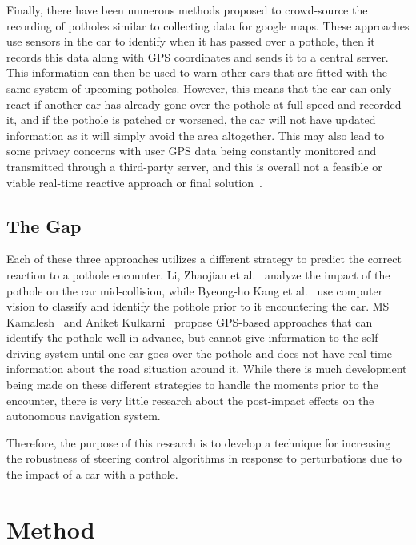 \documentclass{article}
\begin{document}
Finally, there have been numerous methods proposed to crowd-source the recording of potholes similar to collecting data for google maps. These approaches use sensors in the car to identify when it has passed over a pothole, then it records this data along with GPS coordinates and sends it to a central server. This information can then be used to warn other cars that are fitted with the same system of upcoming potholes. However, this means that the car can only react if another car has already gone over the pothole at full speed and recorded it, and if the pothole is patched or worsened, the car will not have updated information as it will simply avoid the area altogether. This may also lead to some privacy concerns with user GPS data being constantly monitored and transmitted through a third-party server, and this is overall not a feasible or viable real-time reactive approach or final solution~\cite{kamalesh2021intelligent,kulkarni2014pothole}.

\subsection{The Gap}

Each of these three approaches utilizes a different strategy to predict the correct reaction to a pothole encounter. Li, Zhaojian et al.~\cite{li2015road} analyze the impact of the pothole on the car mid-collision, while Byeong-ho Kang et al.~\cite{kang2017pothole} use computer vision to classify and identify the pothole prior to it encountering the car. MS Kamalesh~\cite{kamalesh2021intelligent} and Aniket Kulkarni~\cite{kulkarni2014pothole} propose GPS-based approaches that can identify the pothole well in advance, but cannot give information to the self-driving system until one car goes over the pothole and does not have real-time information about the road situation around it. While there is much development being made on these different strategies to handle the moments prior to the encounter, there is very little research about the post-impact effects on the autonomous navigation system. 

Therefore, the purpose of this research is to develop a technique for increasing the robustness of steering control algorithms in response to perturbations due to the impact of a car with a pothole.

\section{Method}
\end{document}
